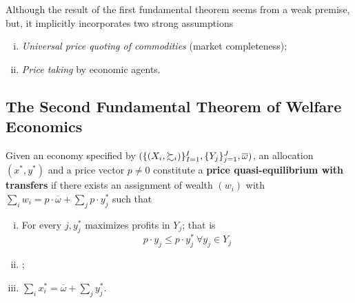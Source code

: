 \documentclass{report}
\begin{document}
		\begin{remark}
			Although the result of the first fundamental theorem seems from a weak premise, but, it implicitly incorporates two strong assumptions
			\begin{enumerate}[(i)]
				\item \emph{Universal price quoting of commodities} (market completeness);
				\item \emph{Price taking} by economic agents.
			\end{enumerate}
		\end{remark}
		
		\subsection{The Second Fundamental Theorem of Welfare Economics}
		\begin{definition}[16.D.1]
			Given an economy specified by $(\{(X_i, \succsim_i)\}_{I=1}^I, \{Y_j\}_{j=1}^J, \overline{\omega})$, an allocation $(x^*, y^*)$ and a price vector $p \neq 0$ constitute a \textbf{price quasi-equilibrium with transfers} if there exists an assignment of wealth $(w_i)$ with $\sum_i w_i = p \cdot \overline{\omega} + \sum_j p \cdot y_j^*$ such that
			\begin{enumerate}[(i)]
				\item For every $j, y_j^*$ maximizes profits in $Y_j$; that is 
				\begin{equation}
					p \cdot y_j \leq p \cdot y_j^*\ \forall y_j \in Y_j
				\end{equation}
				\item {};
				\item $\sum_i x_i^* = \overline{\omega} + \sum_j y_j^*$.
			\end{enumerate}
		\end{definition}
		
\end{document}

